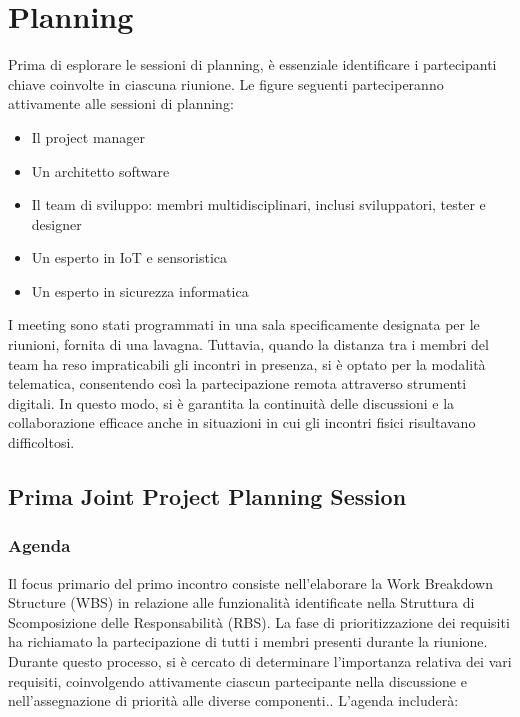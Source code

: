 \chapter{Planning}

Prima di esplorare le sessioni di planning, è essenziale identificare i partecipanti chiave coinvolte in ciascuna riunione. Le figure seguenti parteciperanno attivamente alle sessioni di planning:

\begin{itemize}
    \item Il project manager
    \item Un architetto software
    \item Il team di sviluppo: membri multidisciplinari, inclusi sviluppatori, tester e designer
    \item Un esperto in IoT e sensoristica
    \item Un esperto in sicurezza informatica
\end{itemize}

I meeting sono stati programmati in una sala specificamente designata per le riunioni, fornita di una lavagna. Tuttavia, quando la distanza tra i membri del team ha reso impraticabili gli incontri in presenza, si è optato per la modalità telematica, consentendo così la partecipazione remota attraverso strumenti digitali. In questo modo, si è garantita la continuità delle discussioni e la collaborazione efficace anche in situazioni in cui gli incontri fisici risultavano difficoltosi.

\section{Prima Joint Project Planning Session}

\subsection{Agenda}

Il focus primario del primo incontro consiste nell'elaborare la Work Breakdown Structure (WBS) in relazione alle funzionalità identificate nella Struttura di Scomposizione delle Responsabilità (RBS). La fase di prioritizzazione dei requisiti ha richiamato la partecipazione di tutti i membri presenti durante la riunione. Durante questo processo, si è cercato di determinare l'importanza relativa dei vari requisiti, coinvolgendo attivamente ciascun partecipante nella discussione e nell'assegnazione di priorità alle diverse componenti.. L'agenda includerà:


